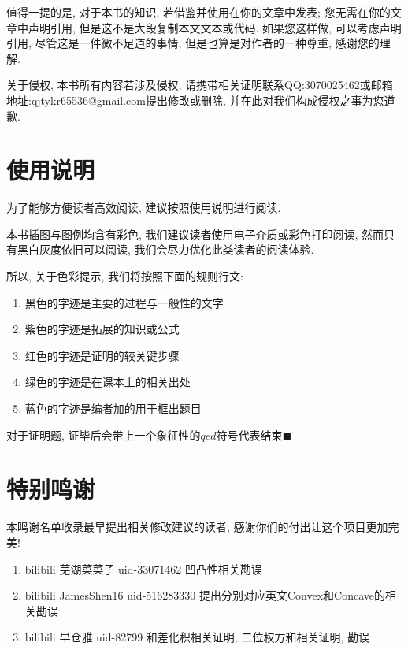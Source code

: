\documentclass{book}
\begin{document}
    值得一提的是, 对于本书的知识, 若借鉴并使用在你的文章中发表; 您无需在你的文章中声明引用, 但是这不是大段复制本文文本或代码. 如果您这样做, 可以考虑声明引用, 尽管这是一件微不足道的事情, 但是也算是对作者的一种尊重, 感谢您的理解.

    关于侵权, 本书所有内容若涉及侵权, 请携带相关证明联系QQ:3070025462或邮箱地址:qjtykr65536@gmail.com提出修改或删除, 并在此对我们构成侵权之事为您道歉.
    \section{使用说明}

    为了能够方便读者高效阅读, 建议按照使用说明进行阅读.

    本书插图与图例均含有彩色, 我们建议读者使用电子介质或彩色打印阅读, 然而只有黑白灰度依旧可以阅读, 我们会尽力优化此类读者的阅读体验.

    所以, 关于色彩提示, 我们将按照下面的规则行文:

    \begin{enumerate}
        \item 黑色的字迹是主要的过程与一般性的文字
        \item \textcolor[rgb]{0.38,0.11,0.2}{紫色的字迹是拓展的知识或公式}
        \item \textcolor[rgb]{0.75,0.17,0.22}{红色的字迹是证明的较关键步骤}
        \item \textcolor[rgb]{0.11,0.65,0.52}{绿色的字迹是在课本上的相关出处}
        \item \textcolor[rgb]{0.13,0.47,0.72}{蓝色的字迹是编者加的用于框出题目}
    \end{enumerate}

    对于证明题, 证毕后会带上一个象征性的$qed$符号代表结束$\blacksquare$

    \section{特别鸣谢}
    本鸣谢名单收录最早提出相关修改建议的读者, 感谢你们的付出让这个项目更加完美!
    \begin{enumerate}
        \item bilibili 芜湖菜菜子 uid-33071462 凹凸性相关勘误
        \item bilibili JamesShen16 uid-516283330 提出分别对应英文Convex和Concave的相关勘误
        \item bilibili 早仓雅 uid-82799 和差化积相关证明, 二位权方和相关证明, 勘误
    \end{enumerate}
\end{document}
